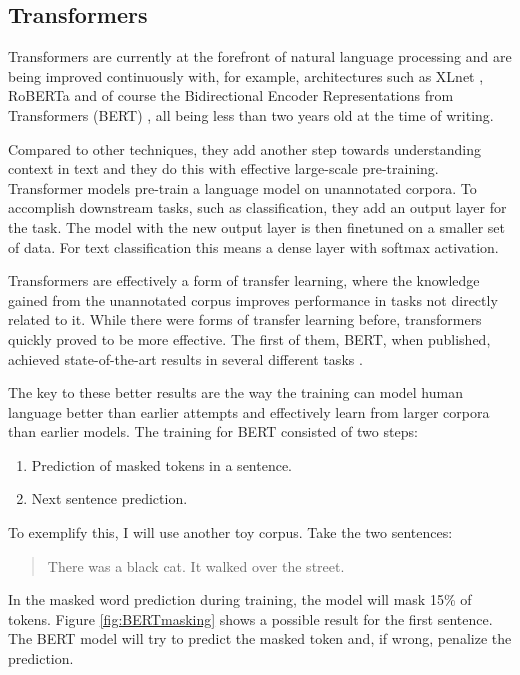 \documentclass[nofilelist]{cslthse-msc}
\begin{document}
\subsection{Transformers}

Transformers are currently at the forefront of natural language processing and are being improved continuously with, for example, architectures such as XLnet \citep{DBLP:journals/corr/abs-1906-08237}, RoBERTa \citep{DBLP:journals/corr/abs-1907-11692} and of course the Bidirectional Encoder Representations from Transformers (BERT)  \citep{DBLP:journals/corr/abs-1810-04805}, all being less than two years old at the time of writing. 

Compared to other techniques, they add another step towards understanding context in text and they do this with effective large-scale pre-training. Transformer models pre-train a language model on unannotated corpora. To accomplish downstream tasks, such as classification, they add an output layer for the task. The model with the new output layer is then finetuned on a smaller set of data. For text classification this means a dense layer with softmax activation.

Transformers are effectively a form of transfer learning, where the knowledge gained from the unannotated corpus improves performance in tasks not directly related to it. While there were forms of transfer learning before, transformers quickly proved to be more effective. The first of them, BERT, when published, achieved state-of-the-art results in several different tasks \citep{DBLP:journals/corr/abs-1810-04805}.

The key to these better results are the way the training can model human language better than earlier attempts and effectively learn from larger corpora than earlier models. The training for BERT consisted of two steps:
\begin{enumerate}
    \item Prediction of masked tokens in a sentence.
    \item  Next sentence prediction.
\end{enumerate}

To exemplify this, I will use another toy corpus. Take the two sentences:
\begin{quote}
There was a black cat. It walked over the street.
\end{quote}
In the masked word prediction during training, the model will mask 15\% of tokens. Figure \ref{fig:BERTmasking} shows a possible result for the first sentence. The BERT model will try to predict the masked token and, if wrong, penalize the prediction.
\end{document}
